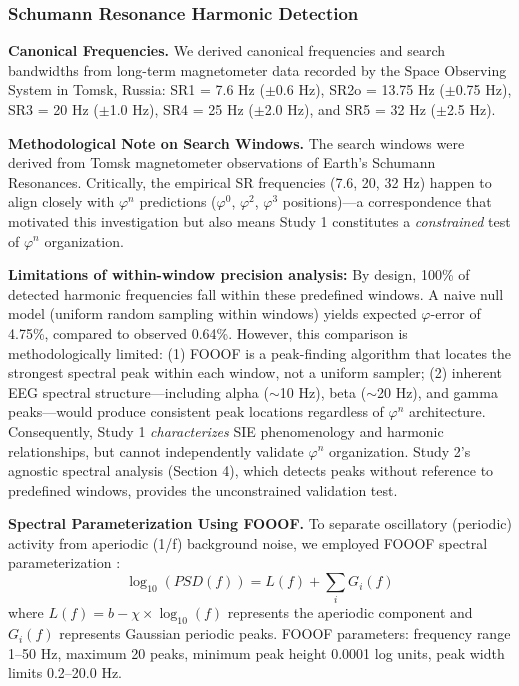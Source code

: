 \documentclass[11pt,a4paper]{article}
\newcommand{\phisym}{\varphi}
\begin{document}
\subsubsection{Schumann Resonance Harmonic Detection}

\textbf{Canonical Frequencies.}
We derived canonical frequencies and search bandwidths from long-term magnetometer data recorded by the Space Observing System in Tomsk, Russia: SR1 = 7.6 Hz ($\pm$0.6 Hz), SR2o = 13.75 Hz ($\pm$0.75 Hz), SR3 = 20 Hz ($\pm$1.0 Hz), SR4 = 25 Hz ($\pm$2.0 Hz), and SR5 = 32 Hz ($\pm$2.5 Hz).

\textbf{Methodological Note on Search Windows.}
The search windows were derived from Tomsk magnetometer observations of Earth's Schumann Resonances. Critically, the empirical SR frequencies (7.6, 20, 32 Hz) happen to align closely with $\phisym^n$ predictions ($\phisym^0$, $\phisym^2$, $\phisym^3$ positions)---a correspondence that motivated this investigation but also means Study 1 constitutes a \textit{constrained} test of $\phisym^n$ organization.

\textbf{Limitations of within-window precision analysis:} By design, 100\% of detected harmonic frequencies fall within these predefined windows. A naive null model (uniform random sampling within windows) yields expected $\phisym$-error of 4.75\%, compared to observed 0.64\%. However, this comparison is methodologically limited: (1) FOOOF is a peak-finding algorithm that locates the strongest spectral peak within each window, not a uniform sampler; (2) inherent EEG spectral structure---including alpha ($\sim$10 Hz), beta ($\sim$20 Hz), and gamma peaks---would produce consistent peak locations regardless of $\phisym^n$ architecture. Consequently, Study 1 \textit{characterizes} SIE phenomenology and harmonic relationships, but cannot independently validate $\phisym^n$ organization. Study 2's agnostic spectral analysis (Section 4), which detects peaks without reference to predefined windows, provides the unconstrained validation test.

\textbf{Spectral Parameterization Using FOOOF.}
To separate oscillatory (periodic) activity from aperiodic (1/f) background noise, we employed FOOOF spectral parameterization \parencite{donoghue2020fooof}:
\begin{equation}
\log_{10}(PSD(f)) = L(f) + \sum_{i} G_{i}(f)
\end{equation}
where $L(f) = b - \chi \times \log_{10}(f)$ represents the aperiodic component and $G_i(f)$ represents Gaussian periodic peaks. FOOOF parameters: frequency range 1--50 Hz, maximum 20 peaks, minimum peak height 0.0001 log units, peak width limits 0.2--20.0 Hz.
\end{document}
